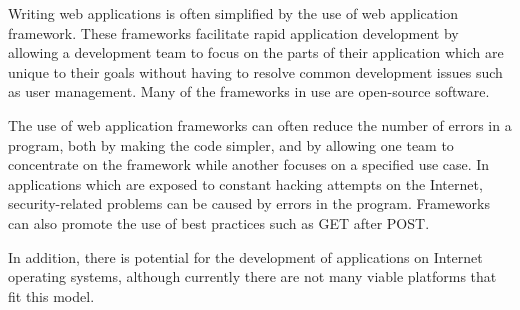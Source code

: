 Writing web applications is often simplified by the use of web application framework. These frameworks facilitate rapid application development by allowing a development team to focus on the parts of their application which are unique to their goals without having to resolve common development issues such as user management. Many of the frameworks in use are open-source software.

The use of web application frameworks can often reduce the number of errors in a program, both by making the code simpler, and by allowing one team to concentrate on the framework while another focuses on a specified use case. In applications which are exposed to constant hacking attempts on the Internet, security-related problems can be caused by errors in the program. Frameworks can also promote the use of best practices such as GET after POST.

In addition, there is potential for the development of applications on Internet operating systems, although currently there are not many viable platforms that fit this model\cite{docforgeFrameworkDocForgeProgramming2010}.